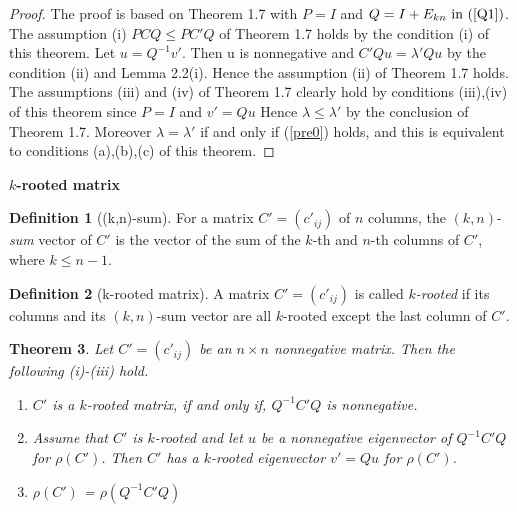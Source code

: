 \documentclass[]{beamer}
\theoremstyle{plain}
\newtheorem{thm}{Theorem}[section]
\theoremstyle{definition}
\newtheorem{defn}[thm]{Definition}
\begin{document}
\begin{frame}{}
   
    \begin{proof}
        The proof is based on Theorem 1.7 with $P = I$ and $Q = I + E_{kn} \text{ in } (\ref{Q1})  $.%
        The assumption (i) $PCQ\leq PC'Q$ of Theorem 1.7 holds by the condition (i) of this theorem. 
        Let $u = Q^{-1}v'$. Then u is nonnegative and $C'Qu = \lambda' Qu$ by the condition (ii) and 
        Lemma 2.2(i). Hence the assumption (ii) of Theorem 1.7 holds. The assumptions (iii) and (iv) 
        of Theorem 1.7 clearly hold by conditions (iii),(iv) of this theorem since $P = I$ and $v'= Qu$  
        Hence $\lambda \leq \lambda' $ by the conclusion of Theorem 1.7. Moreover $\lambda = \lambda'$ 
        if and only if (\ref{pre0}) holds, and this is equivalent to conditions (a),(b),(c) of this theorem. 
        \end{proof}   
    

\end{frame}

\begin{frame}
    {\bf $k$-rooted matrix}
    \begin{defn}[(k,n)-sum]
        For a matrix $C'=(c'_{ij})$ of $n$ columns, the $(k, n)$-{\it sum} vector of $C'$ is the vector of the sum of the $k$-th and  $n$-th columns of $C'$, where $k\leq n-1$.
    \end{defn}

    \begin{defn}[k-rooted matrix]\label{m_rooted}
        A  matrix $C'=(c'_{ij})$ is called {\it $k$-rooted}  if its  columns and its $(k, n)$-sum vector are all $k$-rooted except the last column of $C'$.
    \end{defn}
\end{frame}

\begin{frame}

    \begin{thm} \label{lma_m_rooted}
        Let $C'=(c'_{ij})$ be an $n\times n$ nonnegative matrix. Then the following (i)-(iii) hold.
            \begin{enumerate}
                \item[(i)]$C'$ is a $k$-rooted matrix, if and only if, $Q^{-1}C'Q$ is nonnegative.
                \item[(ii)]Assume that $C'$ is $k$-rooted and let $u$ be a nonnegative eigenvector of $Q^{-1}C'Q$ for $\rho(C')$. Then  $C'$ has a $k$-rooted eigenvector $v'=Qu$ for $\rho(C')$. 
                \item[(iii)] $\rho(C')$ = $\rho(Q^{-1}C'Q)$
            \end{enumerate}
        \end{thm}

\end{frame}
\end{document}
